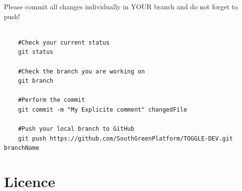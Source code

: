 \documentclass[a4paper,10pt]{report}
\begin{document}
Please commit all changes individually in YOUR branch and do not forget to push!

\begin{verbatim}
 
    #Check your current status
    git status

    #Check the branch you are working on
    git branch

    #Perform the commit
    git commit -m "My Explicite comment" changedFile

    #Push your local branch to GitHub
    git push https://github.com/SouthGreenPlatform/TOGGLE-DEV.git branchName

\end{verbatim}


\appendix

\chapter{Licence}
\end{document}
